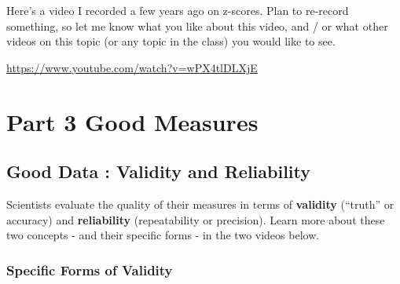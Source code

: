 \documentclass[
  letterpaper,
  DIV=11,
  numbers=noendperiod,
  oneside]{scrreprt}
\begin{document}
Here's a video I recorded a few years ago on z-scores. Plan to re-record
something, so let me know what you like about this video, and / or what
other videos on this topic (or any topic in the class) you would like to
see.

\url{https://www.youtube.com/watch?v=wPX4tlDLXjE}

\chapter{Part 3 \textbar{} Good Measures}\label{part-3-good-measures}

\section{Good Data : Validity and
Reliability}\label{good-data-validity-and-reliability}

Scientists evaluate the quality of their measures in terms of
\textbf{validity} (``truth'' or accuracy) and \textbf{reliability}
(repeatability or precision). Learn more about these two concepts - and
their specific forms - in the two videos below.

\subsection{Specific Forms of
Validity}\label{specific-forms-of-validity}
\end{document}
